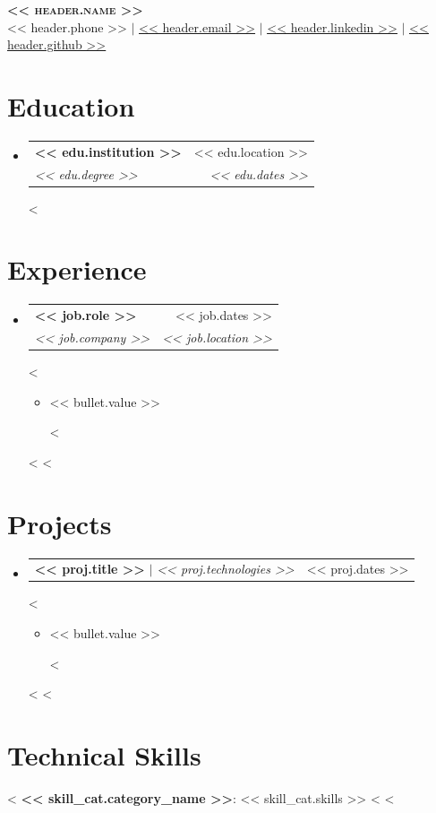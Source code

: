 \documentclass[letterpaper,11pt]{article}
\makeatletter
\newcommand{\resumeItem}[1]{
  \item\small{
    {#1 \vspace{-2pt}}
  }
}
\newcommand{\resumeSubheading}[4]{
  \vspace{-2pt}\item
    \begin{tabular*}{0.97\textwidth}[t]{l@{\extracolsep{\fill}}r}
      \textbf{#1} & #2 \\
      \textit{\small#3} & \textit{\small #4} \\
    \end{tabular*}\vspace{-7pt}
}
\newcommand{\resumeProjectHeading}[2]{
    \item
    \begin{tabular*}{0.97\textwidth}{l@{\extracolsep{\fill}}r}
      \small#1 & #2 \\
    \end{tabular*}\vspace{-7pt}
}
\newcommand{\resumeSubHeadingListStart}{\begin{itemize}[leftmargin=0.15in, label={}]}
\newcommand{\resumeSubHeadingListEnd}{\end{itemize}}
\newcommand{\resumeItemListStart}{\begin{itemize}}
\newcommand{\resumeItemListEnd}{\end{itemize}\vspace{-5pt}}
\makeatother
\begin{document}
\begin{center}
    \textbf{\Huge \scshape << header.name >>} \\ \vspace{1pt}
    \small << header.phone >> $|$ \href{mailto:<< header.email >>}{\underline{<< header.email >>}} $|$ 
    \href{https://<< header.linkedin >>}{\underline{<< header.linkedin >>}} $|$
    \href{https://<< header.github >>}{\underline{<< header.github >>}}
\end{center}

\section{Education}
  \resumeSubHeadingListStart
  <%
    \resumeSubheading
      {<< edu.institution >>}{<< edu.location >>}
      {<< edu.degree >>}{<< edu.dates >>}
  <%
  \resumeSubHeadingListEnd

\section{Experience}
  \resumeSubHeadingListStart
  <%
    \resumeSubheading
      {<< job.role >>}{<< job.dates >>}
        {<< job.company >>}{<< job.location >>}
        <%
          \resumeItemListStart
          <%
            \resumeItem{<< bullet.value >>}
          <%
          \resumeItemListEnd
        <%
  <%
  \resumeSubHeadingListEnd

\section{Projects}
    \resumeSubHeadingListStart
    <%
      \resumeProjectHeading
          {\textbf{<< proj.title >>} $|$ \emph{<< proj.technologies >>}}{<< proj.dates >>}
          <%
            \resumeItemListStart
            <%
              \resumeItem{<< bullet.value >>}
            <%
            \resumeItemListEnd
          <%
    <%
    \resumeSubHeadingListEnd

\section{Technical Skills}
 \begin{itemize}[leftmargin=0.15in, label={}]
    \small{\item{
    <%
     \textbf{<< skill_cat.category_name >>}{: << skill_cat.skills >>} <%
    <%
    }}
 \end{itemize}

\end{document}
